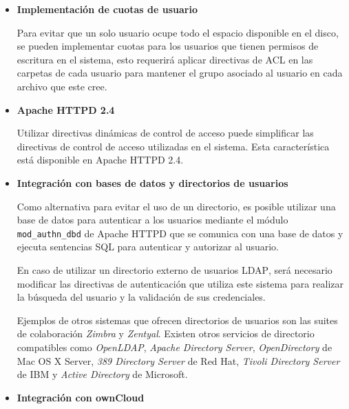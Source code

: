 \begin{itemize}
  \item \textbf{Implementaci\'{o}n de cuotas de usuario}

Para evitar que un solo usuario ocupe todo el espacio disponible en el disco, se pueden implementar cuotas para los usuarios que tienen permisos de escritura en el sistema, esto requerir\'{a} aplicar directivas de \textsc{\gls{ACL}} en las carpetas de cada usuario para mantener el grupo asociado al usuario en cada archivo que este cree. 

  \item \textbf{Apache HTTPD 2.4}

Utilizar directivas din\'{a}micas de control de acceso puede simplificar las directivas de control de acceso utilizadas en el sistema. Esta caracter\'{i}stica est\'{a} disponible en Apache \textsc{HTTPD} 2.4.%

  \item \textbf{Integraci\'{o}n con bases de datos y directorios de usuarios}


Como alternativa para evitar el uso de un directorio, es posible utilizar una base de datos para autenticar a los usuarios mediante el m\'{o}dulo \texttt{mod\_authn\_dbd} de Apache \textsc{HTTPD} que se comunica con una base de datos y ejecuta sentencias \textsc{SQL} para autenticar y autorizar al usuario.

En caso de utilizar un directorio externo de usuarios \textsc{\gls{LDAP}}, ser\'{a} necesario modificar las directivas de autenticaci\'{o}n que utiliza este sistema para realizar la b\'{u}squeda del usuario y la validaci\'{o}n de sus credenciales.

Ejemplos de otros sistemas que ofrecen directorios de usuarios son las suites de colaboraci\'{o}n \textsl{Zimbra} y \textsl{Zentyal}.  Existen otros servicios de directorio compatibles como \textit{OpenLDAP}, \textit{Apache Directory Server}, \textit{OpenDirectory} de Mac OS X Server, \textit{389 Directory Server} de Red Hat, \textit{Tivoli Directory Server} de IBM y \textit{Active Directory} de Microsoft.

  \item \textbf{Integraci\'{o}n con ownCloud}


\end{itemize}
